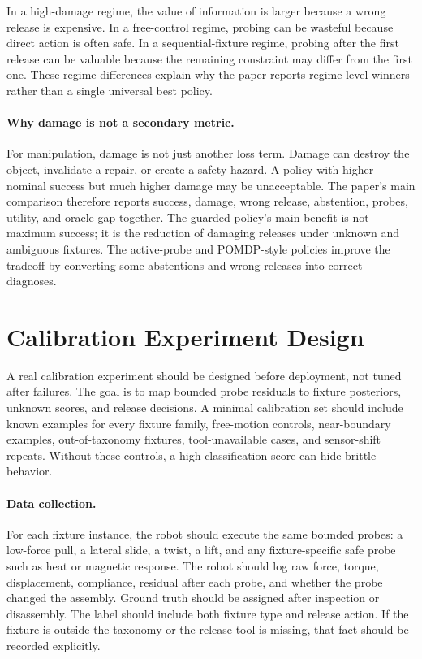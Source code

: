 \documentclass{article}
\begin{document}
In a high-damage regime, the value of information is larger because a wrong
release is expensive. In a free-control regime, probing can be wasteful because
direct action is often safe. In a sequential-fixture regime, probing after the
first release can be valuable because the remaining constraint may differ from
the first one. These regime differences explain why the paper reports
regime-level winners rather than a single universal best policy.

\paragraph{Why damage is not a secondary metric.}
For manipulation, damage is not just another loss term. Damage can destroy the
object, invalidate a repair, or create a safety hazard. A policy with higher
nominal success but much higher damage may be unacceptable. The paper's main
comparison therefore reports success, damage, wrong release, abstention,
probes, utility, and oracle gap together. The guarded policy's main benefit is
not maximum success; it is the reduction of damaging releases under unknown
and ambiguous fixtures. The active-probe and POMDP-style policies improve the
tradeoff by converting some abstentions and wrong releases into correct
diagnoses.

\section{Calibration Experiment Design}

A real calibration experiment should be designed before deployment, not tuned
after failures. The goal is to map bounded probe residuals to fixture
posteriors, unknown scores, and release decisions. A minimal calibration set
should include known examples for every fixture family, free-motion controls,
near-boundary examples, out-of-taxonomy fixtures, tool-unavailable cases, and
sensor-shift repeats. Without these controls, a high classification score can
hide brittle behavior.

\paragraph{Data collection.}
For each fixture instance, the robot should execute the same bounded probes:
a low-force pull, a lateral slide, a twist, a lift, and any fixture-specific
safe probe such as heat or magnetic response. The robot should log raw force,
torque, displacement, compliance, residual after each probe, and whether the
probe changed the assembly. Ground truth should be assigned after inspection
or disassembly. The label should include both fixture type and release action.
If the fixture is outside the taxonomy or the release tool is missing, that
fact should be recorded explicitly.
\end{document}
